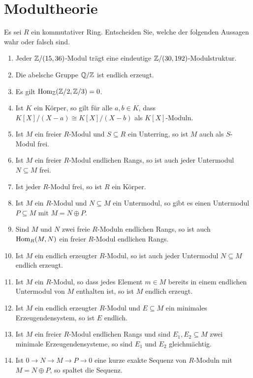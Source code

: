 \section{Modultheorie}


\begin{question}[subtitle = Wahr oder Falsch?]
  Es sei $R$ ein kommutativer Ring.
  Entscheiden Sie, welche der folgenden Aussagen wahr oder falsch sind.
  \begin{enumerate}
    \item
      Jeder $\mathbb{Z}/(15,36)$-Modul trägt eine eindeutige $\mathbb{Z}/(30,192)$-Modulstruktur.
    \item
      Die abelsche Gruppe $\mathbb{Q}/\mathbb{Z}$ ist endlich erzeugt.
    \item
      Es gilt $\operatorname{Hom}_{\mathbb{Z}}(\mathbb{Z}/2, \mathbb{Z}/3) = 0$.
    \item
      Ist $K$ ein Körper, so gilt für alle $a, b \in K$, dass $K[X]/(X-a) \cong K[X]/(X-b)$ als $K[X]$-Moduln.
    \item
      Ist $M$ ein freier $R$-Modul und $S \subseteq R$ ein Unterring, so ist $M$ auch als $S$-Modul frei.
    \item
      Ist $M$ ein freier $R$-Modul endlichen Rangs, so ist auch jeder Untermodul $N \subseteq M$ frei.
    \item
      Ist jeder $R$-Modul frei, so ist $R$ ein Körper.
    \item
      Ist $M$ ein $R$-Modul und $N \subseteq M$ ein Untermodul, so gibt es einen Untermodul $P \subseteq M$ mit $M = N \oplus P$.
    \item
      Sind $M$ und $N$ zwei freie $R$-Moduln endlichen Rangs, so ist auch $\operatorname{Hom}_R(M, N)$ ein freier $R$-Modul endlichen Rangs.
    \item
      Ist $M$ ein endlich erzeugter $R$-Modul, so ist auch jeder Untermodul $N \subseteq M$ endlich erzeugt.
    \item
      Ist $M$ ein $R$-Modul, so dass jedes Element $m \in M$ bereits in einem endlichen Untermodul von $M$ enthalten ist, so ist $M$ endlich erzeugt.
    \item
      Ist $M$ ein endlich erzeugter $R$-Modul und $E \subseteq M$ ein minimales Erzeugendensystem, so ist $E$ endlich.
    \item
      Ist $M$ ein freier $R$-Modul endlichen Rangs und sind $E_1, E_2 \subseteq M$ zwei minimale Erzeugendensysteme, so sind $E_1$ und $E_2$ gleichmächtig.
    \item
      Ist $0 \to N \to M \to P \to 0$ eine kurze exakte Sequenz von $R$-Moduln mit $M = N \oplus P$, so spaltet die Sequenz.

\end{enumerate}
\end{question}
